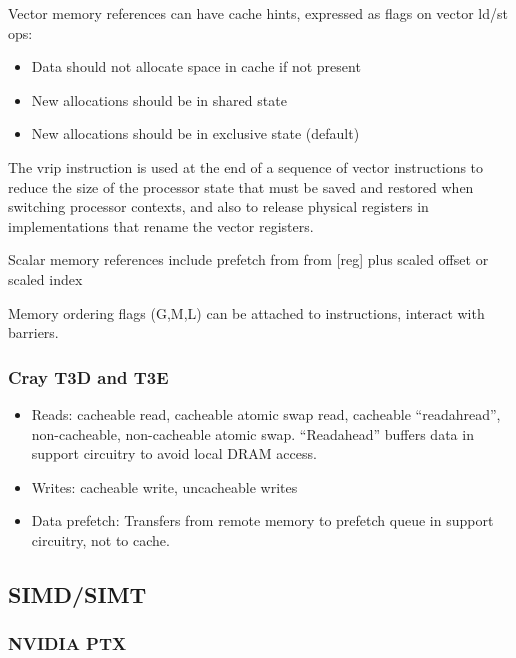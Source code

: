 Vector memory references can have cache hints, expressed as flags on vector ld/st ops:
\begin{itemize}
\item Data should not allocate space in cache if not present
\item New allocations should be in shared state
\item New allocations should be in exclusive state (default)
\end{itemize}

The vrip instruction is used at the end of a sequence of vector instructions to reduce the size of the processor state that must be saved and restored when switching processor contexts, and also to release physical registers in implementations that rename the vector registers.

Scalar memory references include prefetch from from [reg] plus scaled offset or scaled index

Memory ordering flags (G,M,L) can be attached to instructions, interact with barriers.

\subsubsection{Cray T3D and T3E}
\begin{itemize}
\item Reads: cacheable read, cacheable atomic swap read, cacheable ``readahread'', non-cacheable, non-cacheable atomic swap. ``Readahead'' buffers data in support circuitry to avoid local DRAM access.
\item Writes: cacheable write, uncacheable writes
\item Data prefetch: Transfers from remote memory to prefetch queue in support circuitry, not to cache.
\end{itemize}

\subsection{SIMD/SIMT}

\subsubsection{NVIDIA PTX}

